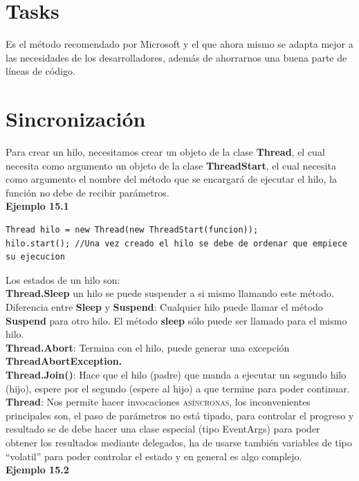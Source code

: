 \documentclass[12pt,a4paper]{report}
\begin{document}
\section{Tasks}
Es el método recomendado por Microsoft y el que ahora mismo se adapta mejor a las necesidades de los desarrolladores, además de ahorrarnos una buena parte de líneas de código.
\section{Sincronización}
Para crear un hilo, necesitamos crear un objeto de la clase\textbf{ Thread}, el cual necesita como argumento un objeto de la clase\textbf{ ThreadStart}, el cual necesita como argumento el nombre del método que se encargará de ejecutar el hilo, la función no debe de recibir parámetros.\\\textbf{Ejemplo 15.1}
\begin{lstlisting}
Thread hilo = new Thread(new ThreadStart(funcion));
hilo.start(); //Una vez creado el hilo se debe de ordenar que empiece su ejecucion
\end{lstlisting}Los estados de un hilo son:\\\textbf{Thread.Sleep} un hilo se puede suspender a si mismo llamando este método. Diferencia entre\textbf{ Sleep} y\textbf{ Suspend}: Cualquier hilo puede llamar el método\textbf{ Suspend} para otro hilo. El método\textbf{ sleep} sólo puede ser llamado para el mismo hilo.\\\textbf{Thread.Abort}: Termina con el hilo, puede generar una excepción\textbf{ ThreadAbortException.}\\\textbf{Thread.Join()}: Hace que el hilo (padre) que manda a ejecutar un segundo hilo (hijo), espere por el segundo (espere al hijo) a que termine para poder continuar.\\\textbf{Thread}: Nos permite hacer invocaciones \textsc{asíncronas}, los inconvenientes principales son, el paso de parámetros no está tipado, para controlar el progreso y resultado se de debe hacer una clase especial (tipo EventArgs) para poder obtener los resultados mediante delegados, ha de usarse también variables de tipo “volatil” para poder controlar el estado y en general es algo complejo.\\\textbf{Ejemplo 15.2}
\end{document}

